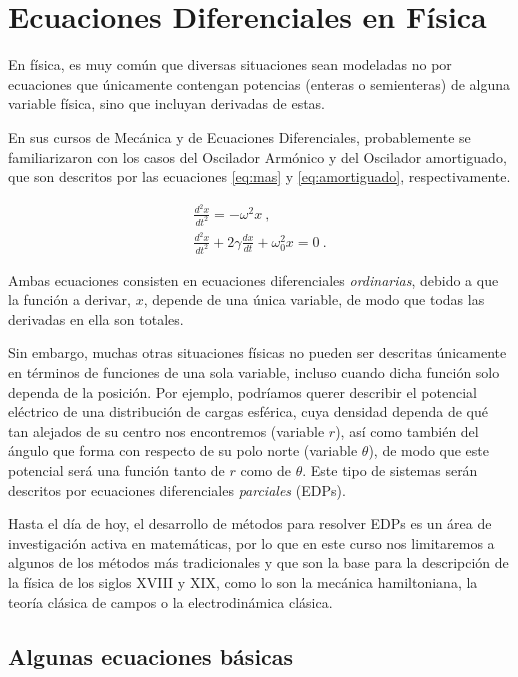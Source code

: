\chapter{Ecuaciones Diferenciales en Física}

En física, es muy común que diversas situaciones sean modeladas no por ecuaciones que únicamente contengan potencias (enteras o semienteras) de alguna variable física, sino que incluyan derivadas de estas.

En sus cursos de Mecánica y de Ecuaciones Diferenciales, probablemente se familiarizaron con los casos del Oscilador Armónico y del Oscilador amortiguado, que son descritos por las ecuaciones \eqref{eq:mas} y \eqref{eq:amortiguado}, respectivamente.

\begin{gather}
    \frac{d^2x}{dt^2} = - \omega^2 x \ , \label{eq:mas} \\
    \frac{d^2x}{dt^2} + 2\gamma \frac{dx}{dt} + \omega^2_0 x = 0 \ . \label{eq:amortiguado}
\end{gather}

Ambas ecuaciones consisten en ecuaciones diferenciales \emph{ordinarias}, debido a que la función a derivar, $x$, depende de una única variable, de modo que todas las derivadas en ella son totales.

Sin embargo, muchas otras situaciones físicas no pueden ser descritas únicamente en términos de funciones de una sola variable, incluso cuando dicha función solo dependa de la posición. Por ejemplo, podríamos querer describir el potencial eléctrico de una distribución de cargas esférica, cuya densidad dependa de qué tan alejados de su centro nos encontremos (variable $r$), así como también del ángulo que forma con respecto de su polo norte (variable $\theta$), de modo que este potencial será una función tanto de $r$ como de $\theta$. Este tipo de sistemas serán descritos por ecuaciones diferenciales \emph{parciales} (EDPs).

Hasta el día de hoy, el desarrollo de métodos para resolver EDPs es un área de investigación activa en matemáticas, por lo que en este curso nos limitaremos a algunos de los métodos más tradicionales y que son la base para la descripción de la física de los siglos XVIII y XIX, como lo son la mecánica hamiltoniana, la teoría clásica de campos o la electrodinámica clásica.

\section{Algunas ecuaciones básicas}

